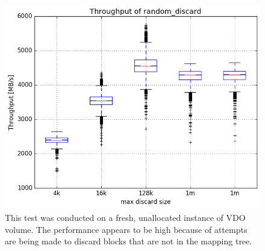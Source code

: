 \documentclass[
  color, %
  table, %
  lof,   %
  lot,   %
]{fithesis3}
\begin{document}
\begin{figure}
\centering
\includegraphics[width=\textwidth]{../results/discards/unalloc_VDO/report/random_discard1_compare_boxplots}
\caption[Performance of discard operation on an unnallocated VDO volume.]{This test was conducted on a fresh, unallocated instance of VDO volume. The performance appears to be high because of attempts are being made to discard blocks that are not in the mapping tree.}
\label{fig:discard-unalloc}
\end{figure}
\end{document}
